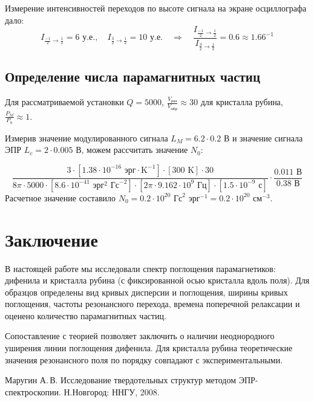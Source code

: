 \documentclass[a4paper,14pt]{extarticle}
\begin{document}
Измерение интенсивностей переходов по высоте сигнала на экране осциллографа дало:
\begin{equation}
  I_{\frac{-1}{2}\to\frac12} = 6 \text{ у.е.}, \quad
  I_{\frac{3}{2}\to\frac12} = 10 \text{ у.е.} 
  \quad \Rightarrow \quad
  \frac{I_{\frac{-1}{2}\to\frac12}}{I_{\frac{3}{2}\to\frac12}}=0.6\approx 1.66^{-1}
\end{equation}

\subsection{Определение числа парамагнитных частиц}
Для рассматриваемой установки  $Q=5000$, $\frac{V_\text{рез}}{V_\text{обр}} \approx 30$ для кристалла рубина, $ \frac{P_M}{P_n}\approx1$. 

Измерив значение модулированного сигнала $L_M=6.2 \cdot 0.2$ В и значение сигнала ЭПР $L_c=2\cdot 0.005$ В, можем рассчитать значение $N_0$:

\begin{equation}
  \frac{3\cdot [1.38\cdot10^{-16} \text{ эрг}\cdot\text{K}^{-1}]\cdot [300 \text{ K}]\cdot 30}{8\pi \cdot 5000 \cdot [8.6\cdot 10^{-41} \text{ эрг}^2\text{ Гс}^{-2}]\cdot [2\pi\cdot 9.162\cdot 10^9 \text{ Гц} ]\cdot [1.5 \cdot 10^{-9} \text{ с}]}\cdot \frac{0.011 \text{ В}}{0.38 \text{ В}}
\end{equation}
Расчетное значение составило $N_0=0.2\cdot 10^{20} \text{ Гс}^2 \text{ эрг}^{-1}=0.2\cdot 10^{20} \text{ см}^{-3}$.

\section*{Заключение}
В настоящей работе мы исследовали спектр поглощения парамагнетиков: дифенила и кристалла рубина (с фиксированной осью кристалла вдоль поля). Для образцов определены вид кривых дисперсии и поглощения, ширины кривых поглощения, частоты резонансного перехода, времена поперечной релаксации и оценено количество парамагнитных частиц.

Сопоставление с теорией позволяет заключить о наличии неоднородного уширения линии поглощения дифенила. Для кристалла рубина теоретические значения резонансного поля по порядку совпадают с экспериментальными.

\begin{thebibliography}{}

   Маругин\,\,А.\,В. Исследование твердотельных структур методом ЭПР-спектроскопии. Н.Новгород: ННГУ, 2008.
\end{thebibliography}
\end{document}
